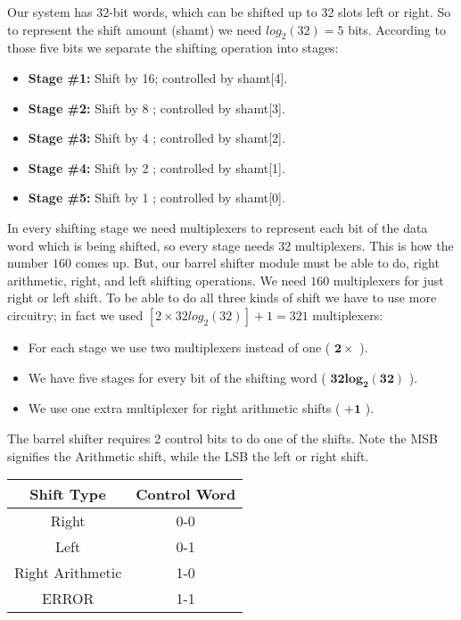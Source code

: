 	Our system has 32-bit words, which can be shifted up to 32 slots left or right. So to represent the shift amount (shamt) we need $log_2(32) = 5$ bits. According to those five bits we separate the shifting operation into stages:

	\begin{itemize}
		\setlength\itemsep{-0.1em}
		\item \textbf{Stage \#1:} Shift by 16; controlled by shamt[4].
		\item \textbf{Stage \#2:} Shift by 8 ; controlled by shamt[3].
		\item \textbf{Stage \#3:} Shift by 4 ; controlled by shamt[2].
		\item \textbf{Stage \#4:} Shift by 2 ; controlled by shamt[1].
		\item \textbf{Stage \#5:} Shift by 1 ; controlled by shamt[0].
	\end{itemize}

	In every shifting stage we need multiplexers to represent each bit of the data word which is being shifted, so every stage needs 32 multiplexers. This is how the number $160$ comes up. But, our barrel shifter module must be able to do, right arithmetic, right, and left shifting operations. We need $160$ multiplexers for just right or left shift. To be able to do all three kinds of shift we have to use more circuitry; in fact we used $[2 \times 32log_{2}(32)] + 1 = 321$ multiplexers:
	
	\begin{itemize}
		\setlength\itemsep{-0.1em}
		\item For each stage we use two multiplexers instead of one ( $\mathbf{2\times}$ ).
		\item We have five stages for every bit of the shifting word ( $\mathbf{32log_{2}(32)}$ ).
		\item We use one extra multiplexer for right arithmetic shifts ( $\textbf{+1}$ ).
		
	\end{itemize}

	The barrel shifter requires 2 control bits to do one of the shifts. Note the MSB signifies the Arithmetic shift, while the LSB the left or right shift.
	
	\begin{center}
		\begin{tabular}{|c|c|} \hline
			
			\setrow{\bfseries}Shift Type  &\setrow{\bfseries} Control Word \\\hline
			Right			 & 0-0 \\\hline
			Left   			 & 0-1 \\\hline
			Right Arithmetic & 1-0 \\\Xhline{5\arrayrulewidth}
			ERROR 	    	 & 1-1 \\\hline
		\end{tabular}
	\end{center}

